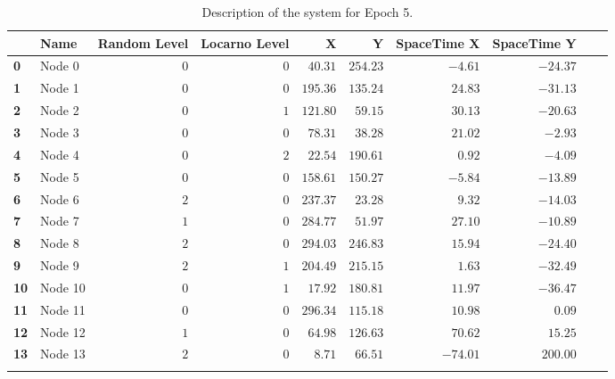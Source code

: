\documentclass[a4paper,11pt,twoside=semi,openright]{report}
\begin{document}
\begin{table}[h]
\centering
\tiny
\begin{tabular}{@{}llrrrrrrll@{}}
\toprule
& \textbf{Name}   &\textbf{Random Level} &\textbf{Locarno Level} & \textbf{X} & \textbf{Y} & \textbf{SpaceTime X} & \textbf{SpaceTime Y}  \\ \midrule
\textbf{0} & Node 0&$0$&$0$&$40.31$&$254.23$&$-4.61$&$-24.37$&\\ \hdashline
\textbf{1} & Node 1&$0$&$0$&$195.36$&$135.24$&$24.83$&$-31.13$&\\ \hdashline
\textbf{2} & Node 2&$0$&$1$&$121.80$&$59.15$&$30.13$&$-20.63$&\\ \hdashline
\textbf{3} & Node 3&$0$&$0$&$78.31$&$38.28$&$21.02$&$-2.93$&\\ \hdashline
\textbf{4} & Node 4&$0$&$2$&$22.54$&$190.61$&$0.92$&$-4.09$&\\ \hdashline
\textbf{5} & Node 5&$0$&$0$&$158.61$&$150.27$&$-5.84$&$-13.89$&\\ \hdashline
\textbf{6} & Node 6&$2$&$0$&$237.37$&$23.28$&$9.32$&$-14.03$&\\ \hdashline
\textbf{7} & Node 7&$1$&$0$&$284.77$&$51.97$&$27.10$&$-10.89$&\\ \hdashline
\textbf{8} & Node 8&$2$&$0$&$294.03$&$246.83$&$15.94$&$-24.40$&\\ \hdashline
\textbf{9} & Node 9&$2$&$1$&$204.49$&$215.15$&$1.63$&$-32.49$&\\ \hdashline
\textbf{10} & Node 10&$0$&$1$&$17.92$&$180.81$&$11.97$&$-36.47$&\\ \hdashline
\textbf{11} & Node 11&$0$&$0$&$296.34$&$115.18$&$10.98$&$0.09$&\\ \hdashline
\textbf{12} & Node 12&$1$&$0$&$64.98$&$126.63$&$70.62$&$15.25$&\\ \hdashline
\textbf{13} & Node 13&$2$&$0$&$8.71$&$66.51$&$-74.01$&$200.00$&\\ \hdashline\midrule
\bottomrule
\end{tabular}
\caption{Description of the system for Epoch 5.}
\end{table}
\end{document}
